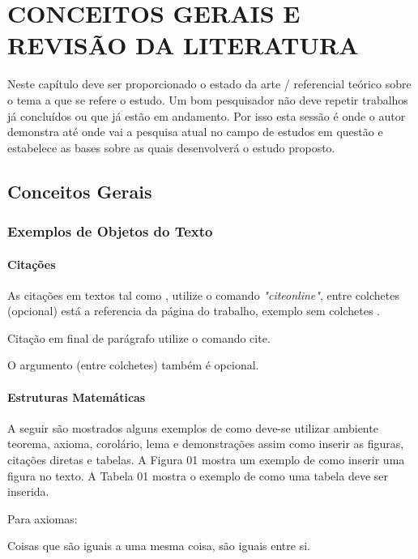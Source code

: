 \chapter{CONCEITOS GERAIS E REVISÃO DA LITERATURA}


Neste capítulo deve ser proporcionado o estado da arte / referencial teórico sobre o tema a que se refere o estudo. Um bom pesquisador não deve repetir trabalhos já concluídos ou que já estão em andamento. Por isso esta sessão é onde o autor demonstra até onde vai a pesquisa atual no campo de estudos em questão e estabelece as bases sobre as quais desenvolverá o estudo proposto. 

\section{Conceitos Gerais}

\subsection{Exemplos de Objetos do Texto}

\subsubsection{Citações}
As citações em textos tal como , utilize o comando \textit{"citeonline"}, entre colchetes (opcional) está a referencia da página do trabalho, exemplo sem colchetes .

Citação em final de parágrafo utilize o comando cite. \cite{examplephdthesis}

O argumento (entre colchetes) também é opcional. \cite[p. 1]{examplephdthesis}

\subsubsection{Estruturas Matemáticas}
A seguir são mostrados alguns exemplos de como deve-se utilizar ambiente teorema, axioma, corolário, lema e demonstrações assim como inserir as figuras, citações diretas e tabelas. A Figura 01 mostra um exemplo de como inserir uma figura no texto. A Tabela 01 mostra o exemplo de como uma tabela deve ser inserida.

Para axiomas:
\begin{axm}
    Coisas que são iguais a uma mesma coisa, são iguais entre si.
\end{axm}

